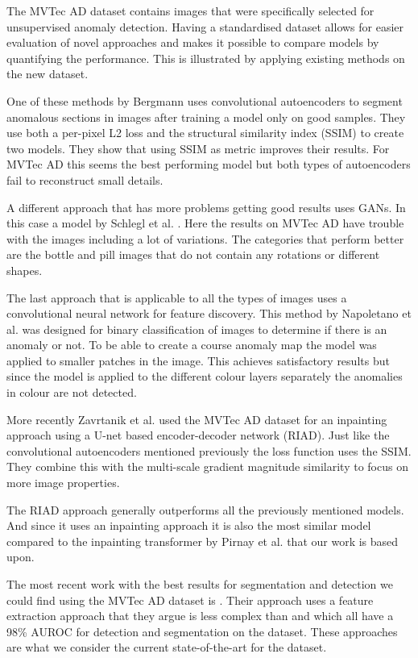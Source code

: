 The MVTec AD dataset contains images that were specifically selected for unsupervised anomaly detection. Having a standardised dataset allows for easier evaluation of novel approaches and makes it possible to compare models by quantifying the performance. This is illustrated by applying existing methods on the new dataset.

One of these methods by Bergmann \cite{bergmann_improving_2019} uses convolutional autoencoders to segment anomalous sections in images after training a model only on good samples. They use both a per-pixel L2 loss and the structural similarity index (SSIM) to create two models. They show that using SSIM as metric improves their results. For MVTec AD this seems the best performing model but both types of autoencoders fail to reconstruct small details.

A different approach that has more problems getting good results uses GANs. In this case a model by Schlegl et al. \cite{schlegl_unsupervised_2017}. Here the results on MVTec AD have trouble with the images including a lot of variations. The categories that perform better are the bottle and pill images that do not contain any rotations or different shapes.

The last approach that is applicable to all the types of images uses a convolutional neural network for feature discovery. This method by Napoletano et al. \cite{napoletano_anomaly_2018}   was designed for binary classification of images to determine if there is an anomaly or not. To be able to create a course anomaly map the model was applied to smaller patches in the image. This achieves satisfactory results but since the model is applied to the different colour layers separately the anomalies in colour are not detected.

More recently Zavrtanik et al. \cite{zavrtanik_reconstruction_2021} used the MVTec AD dataset for an inpainting approach using a U-net based encoder-decoder network (RIAD). Just like the convolutional autoencoders mentioned previously the loss function uses the SSIM. They combine this with the multi-scale gradient magnitude similarity \cite{xue_gradient_2014} to focus on more image properties.

The RIAD approach generally outperforms all the previously mentioned models. And since it uses an inpainting approach it is also the most similar model compared to the inpainting transformer by Pirnay et al. \cite{pirnay_inpainting_2021} that our work is based upon.

The most recent work with the best results for segmentation and detection we could find using the MVTec AD dataset is \cite{yu_fastflow_2021}. Their approach uses a feature extraction approach that they argue is less complex than  \cite{roth_towards_2021} and \cite{gudovskiy_cflow-ad_2021} which all have a 98\% AUROC for detection and segmentation on the dataset. These approaches are what we consider the current state-of-the-art for the dataset.

